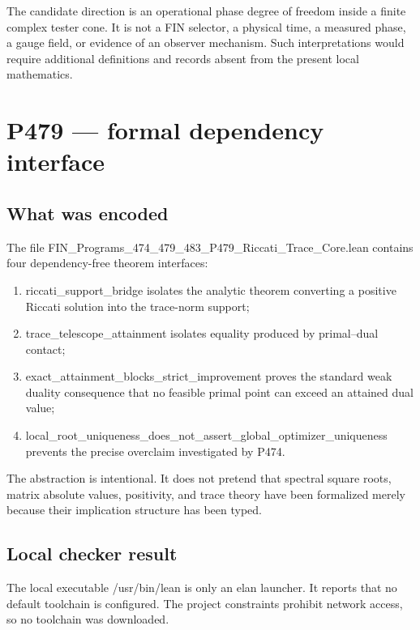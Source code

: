 \documentclass[11pt,a4paper,openany]{report}
\begin{document}
The candidate direction is an operational phase degree of freedom inside a finite complex tester cone. It is not a FIN selector, a physical time, a measured phase, a gauge field, or evidence of an observer mechanism. Such interpretations would require additional definitions and records absent from the present local mathematics.

\chapter{P479 --- formal dependency interface}

\section{What was encoded}

The file FIN\_Programs\_474\_479\_483\_P479\_Riccati\_Trace\_Core.lean contains four dependency-free theorem interfaces:

\begin{enumerate}
\item 
riccati\_support\_bridge isolates the analytic theorem converting a positive Riccati solution into the trace-norm support;

\item 
trace\_telescope\_attainment isolates equality produced by primal--dual contact;

\item 
exact\_attainment\_blocks\_strict\_improvement proves the standard weak duality consequence that no feasible primal point can exceed an attained dual value;

\item 
local\_root\_uniqueness\_does\_not\_assert\_global\_optimizer\_uniqueness prevents the precise overclaim investigated by P474.

\end{enumerate}

The abstraction is intentional. It does not pretend that spectral square roots, matrix absolute values, positivity, and trace theory have been formalized merely because their implication structure has been typed.

\section{Local checker result}

The local executable /\allowbreak{}usr/\allowbreak{}bin/\allowbreak{}lean is only an elan launcher. It reports that no default toolchain is configured. The project constraints prohibit network access, so no toolchain was downloaded.
\end{document}
